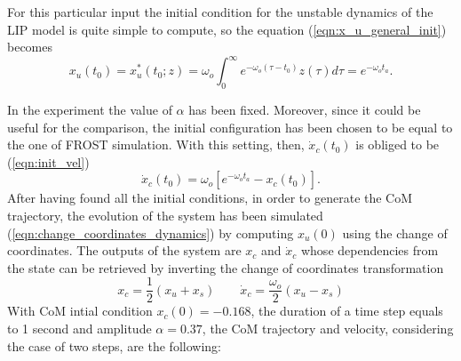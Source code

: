 \documentclass[11pt]{article}
\begin{document}
For this particular input the initial condition for the unstable dynamics of the LIP model is quite simple to compute, so the equation (\ref{eqn:x_u_general_init}) becomes
\begin{equation}
\label{eqn:step_x_u_init}
x_u(t_0) = x_u^*(t_0;z) = \omega_o\int_{0}^\infty{e^{-\omega_o(\tau-t_0)}z(\tau)d\tau} = e^{-\omega_ot_a}.
\end{equation}

In the experiment the value of $\alpha$ has been fixed. Moreover, since it could be useful for the comparison, the initial configuration has been chosen to be equal to the one of FROST simulation. With this setting, then, $\dot{x}_c(t_0)$ is obliged to be (\ref{eqn:init_vel})
\begin{equation}
\label{eqn:init_vel_rabbit}
\dot{x}_c(t_0) = \omega_o[e^{-\omega_ot_a}-x_c(t_0)].
\end{equation}
After having found all the initial conditions, in order to generate the CoM trajectory, the evolution of the system has been simulated (\ref{eqn:change_coordinates_dynamics}) by computing $x_u(0)$ using the change of coordinates. The outputs of the system are $x_c$ and $\dot{x}_c$ whose dependencies from the state can be retrieved by inverting the change of coordinates transformation
\begin{equation}
\label{eqn:com_wrt_change}
x_c = \frac{1}{2}(x_u+x_s) \quad \quad \dot{x}_c = \frac{\omega_o}{2}(x_u-x_s)
\end{equation}
With CoM intial condition $x_c(0) = -0.168$, the duration of a time step equals to 1 second and amplitude $\alpha = 0.37$, the CoM trajectory and velocity, considering the case of two steps, are the following:
\end{document}
